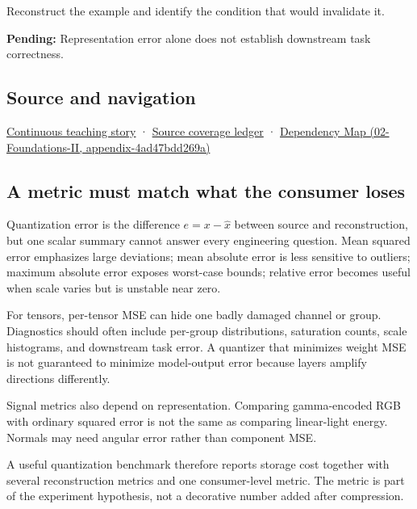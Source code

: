 Reconstruct the example and identify the condition that would invalidate it.

\textbf{Pending:} Representation error alone does not establish downstream task correctness.

\subsection{Source and navigation}\label{appendix-537171d69d27-source-and-navigation}

\hyperref[01-foundations-i-ch001-choosing-what-information-to-keep]{Continuous teaching story} · \hyperref[appendix-fd090d982a15]{Source coverage ledger} · \href{../02-Foundations-II/main.pdf\#nameddest=appendix-4ad47bdd269a}{Dependency Map (02-Foundations-II, appendix-4ad47bdd269a)}

\subsection{A metric must match what the consumer loses}\label{appendix-537171d69d27-a-metric-must-match-what-the-consumer-loses}

Quantization error is the difference \(e=x-\hat x\) between source and reconstruction, but one scalar summary cannot answer every engineering question. Mean squared error emphasizes large deviations; mean absolute error is less sensitive to outliers; maximum absolute error exposes worst-case bounds; relative error becomes useful when scale varies but is unstable near zero.

For tensors, per-tensor MSE can hide one badly damaged channel or group. Diagnostics should often include per-group distributions, saturation counts, scale histograms, and downstream task error. A quantizer that minimizes weight MSE is not guaranteed to minimize model-output error because layers amplify directions differently.

Signal metrics also depend on representation. Comparing gamma-encoded RGB with ordinary squared error is not the same as comparing linear-light energy. Normals may need angular error rather than component MSE.

A useful quantization benchmark therefore reports storage cost together with several reconstruction metrics and one consumer-level metric. The metric is part of the experiment hypothesis, not a decorative number added after compression.
